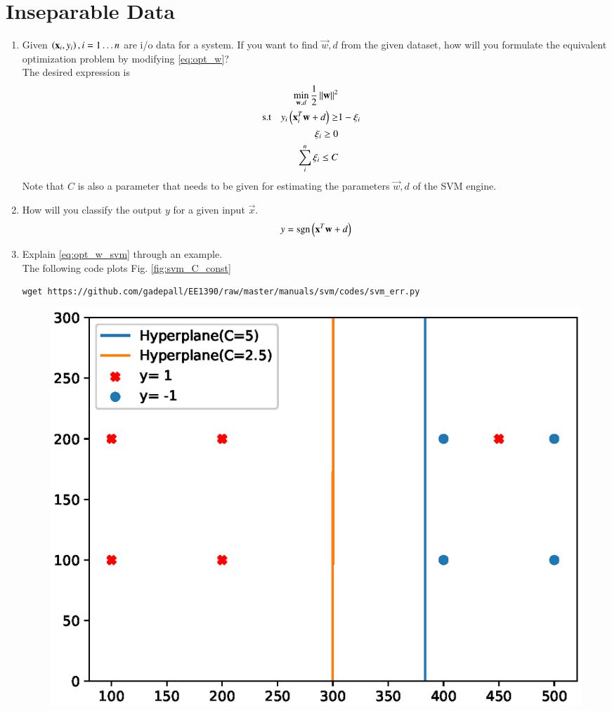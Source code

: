 \documentclass[journal,12pt,twocolumn]{IEEEtran}
\renewcommand\thesection{\arabic{section}}
\begin{document}
\section{Inseparable Data}
\begin{enumerate}[label=\thesection.\arabic*,ref=\thesection.\theenumi]
\item Given $\left(\mathbf{x}_i,y_i\right), i = 1 \dots n$  are i/o data for a system.
If you want 
to find $\vec{w},d$ from the given dataset, how will you formulate the equivalent 
optimization 
problem by modifying \eqref{eq:opt_w}?
\\
\solution The desired expression is
\begin{align}
\label{eq:opt_w_svm}
\min_{\mathbf{w},d}\frac{1}{2}\left\Vert\mathbf{w}\right\Vert^2
\\
\text{s.t} \quad  y_i\left(\mathbf{x}_i^T\mathbf{w}+d\right) \ge& 1 - \xi_i
\\
\xi_i \ge 0
\\
\sum_{i}^{n}\xi_i \le C
\end{align}
Note that $C$ is also a parameter that needs to be given for estimating the parameters $\vec{w}, d$ of the SVM engine.
\item How will you classify the output $y$ for a given input $\vec{x}$.
\\
\solution 
\begin{align}
y = \mathop{\mathrm{sgn}}\left(\mathbf{x}^T\mathbf{w}+d\right)
\end{align}
%
\item Explain  \eqref{eq:opt_w_svm} through an example.
\\
\solution The following code plots Fig. \eqref{fig:svm_C_const}
\begin{lstlisting}
wget https://github.com/gadepall/EE1390/raw/master/manuals/svm/codes/svm_err.py
\end{lstlisting}
\begin{figure}[!ht]
\centering
\includegraphics[width=\columnwidth]{./figs/svm_C_const.eps}

\end{figure}
\end{enumerate}
\end{document}
